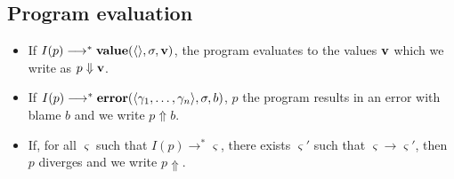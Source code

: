 \subsection{Program evaluation}

\begin{itemize}
\item If $I(p)\longrightarrow^{*}\mathbf{value}(\langle\rangle,\sigma,\mathbf{v})$, the program evaluates to the values $\mathbf{v}$ which we write as $p\Downarrow\mathbf{v}$.
\item If $I(p)\longrightarrow^{*}\mathbf{error}(\langle\gamma_1,\dots,\gamma_n\rangle,\sigma,b)$, $p$ the program results in an error with blame $b$ and we write $p\Uparrow b$.
\item If, for all $\varsigma$ such that $I(p)\longrightarrow^{*}\varsigma$, there exists $\varsigma'$ such that $\varsigma\longrightarrow\varsigma'$, then $p$ diverges and we write $p\Uparrow$.
\end{itemize}

